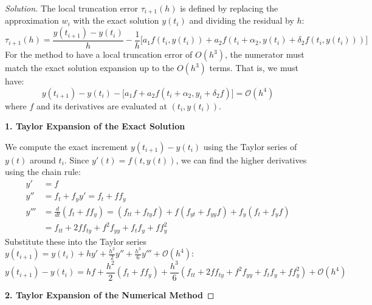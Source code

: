 \documentclass[11pt, a4paper]{article}
\newif\ifsolutionnewpage
\newenvironment{solution}
  {\begin{proof}[Solution]}
  {\end{proof}\ifsolutionnewpage\newpage\fi}
\begin{document}
            \solutionnewpagefalse %
            \begin{solution}
            The local truncation error $\tau_{i+1}(h)$ is defined by replacing the approximation $w_i$ with the exact solution $y(t_i)$ and dividing the residual by $h$:
            \begin{equation*}
            \tau_{i+1}(h) = \frac{y(t_{i+1}) - y(t_i)}{h} - \frac{1}{h} \Big[ a_1 f(t_i, y(t_i)) + a_2 f(t_i + \alpha_2, y(t_i) + \delta_2 f(t_i, y(t_i))) \Big]
            \end{equation*}
            For the method to have a local truncation error of $O(h^3)$, the numerator must match the exact solution expansion up to the $O(h^3)$ terms. That is, we must have:
            \begin{equation*}
            y(t_{i+1}) - y(t_i) - \Big[ a_1 f + a_2 f(t_i + \alpha_2, y_i + \delta_2 f) \Big] = \mathcal{O}(h^4)
            \end{equation*}
            where $f$ and its derivatives are evaluated at $(t_i, y(t_i))$.
            
            \vspace{0.3cm}
            \textbf{1. Taylor Expansion of the Exact Solution}
            
            We compute the exact increment $y(t_{i+1}) - y(t_i)$ using the Taylor series of $y(t)$ around $t_i$. Since $y'(t) = f(t, y(t))$, we can find the higher derivatives using the chain rule:
            \begin{align*}
            y' &= f \\
            y'' &= f_t + f_y y' = f_t + f f_y \\
            y''' &= \frac{d}{dt}(f_t + f f_y) = (f_{tt} + f_{ty} f) + f(f_{yt} + f_{yy} f) + f_y(f_t + f_y f) \\
            &= f_{tt} + 2f f_{ty} + f^2 f_{yy} + f_t f_y + f f_y^2
            \end{align*}
            Substitute these into the Taylor series $y(t_{i+1}) = y(t_i) + h y' + \frac{h^2}{2} y'' + \frac{h^3}{6} y''' + \mathcal{O}(h^4)$:
            \begin{equation} \label{eq:exact_exp}
            y(t_{i+1}) - y(t_i) = hf + \frac{h^2}{2}(f_t + f f_y) + \frac{h^3}{6}(f_{tt} + 2f f_{ty} + f^2 f_{yy} + f_t f_y + f f_y^2) + \mathcal{O}(h^4)
            \end{equation}
            
            \vspace{0.3cm}
            \textbf{2. Taylor Expansion of the Numerical Method}
            

\end{solution}
\end{document}
